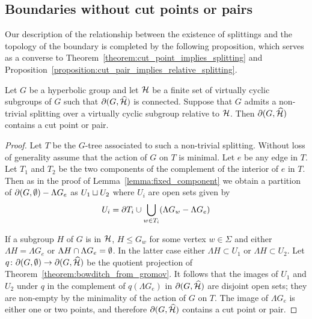 \subsection{Boundaries without cut points or pairs}

Our description of the relationship between the existence of splittings and the topology of the boundary is completed by the following proposition, which serves as a converse to Theorem~\ref{theorem:cut_point_implies_splitting} and Proposition~\ref{proposition:cut_pair_implies_relative_splitting}.

\begin{proposition}\label{prop:relativesplittingimpliescutpair} 
  Let $G$ be a hyperbolic group and let $\mathcal{H}$ be a finite set of virtually cyclic subgroups of $G$ such that $\partial(G, \widehat{\mathcal{H}})$ is connected. 
  Suppose that $G$ admits a non-trivial splitting over a virtually cyclic subgroup relative to $\mathcal{H}$. 
  Then $\partial(G, \widehat{\mathcal{H}})$ contains a cut point or pair.
\end{proposition}

\begin{proof} 
Let $T$ be the $G$-tree associated to such a non-trivial splitting. 
Without loss of generality assume that the action of $G$ on $T$ is minimal. 
Let $e$ be any edge in $T$. 
Let $T_1$ and $T_2$ be the two components of the complement of the interior of $e$ in $T$. 
Then as in the proof of Lemma~\ref{lemma:fixed_component} we obtain a partition of $\partial(G, \emptyset) - \Lambda G_e$ as $U_1\sqcup U_2$ where $U_i$ are open sets given by
\begin{align*}
 U_i = \partial T_i \cup \bigcup_{w \in T_i} (\Lambda G_w - \Lambda G_e)
\end{align*}

If a subgroup $H$ of $G$ is in $\mathcal{H}$, $H \leq G_w$ for some vertex $w \in \Sigma$ and either $\Lambda H = \Lambda G_e$ or $\Lambda H \cap \Lambda G_e = \emptyset$. 
In the latter case either $\Lambda H \subset U_1$ or $\Lambda H \subset U_2$. 
Let $q \colon \partial(G, \emptyset) \to \partial(G, \widehat{\mathcal{H}})$ be the quotient projection of Theorem~\ref{theorem:bowditch_from_gromov}. 
It follows that the images of $U_1$ and $U_2$ under $q$ in the complement of $q(\Lambda G_e)$ in $\partial(G, \widehat{\mathcal{H}})$ are disjoint open sets; they are non-empty by the minimality of the action of $G$ on $T$. 
The image of $\Lambda G_e$ is either one or two points, and therefore $\partial(G, \widehat{\mathcal{H}})$ contains a cut point or pair. 
\end{proof}

